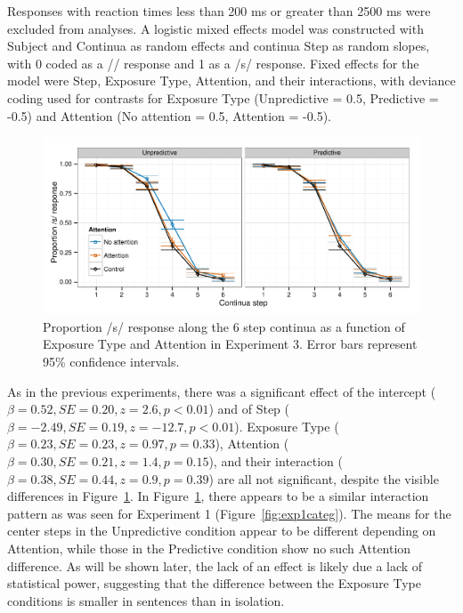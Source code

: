 Responses with reaction times less than 200 ms or greater than 2500 ms were excluded from analyses. 
A logistic mixed effects model was constructed with Subject and Continua as random effects and continua Step as random slopes, with 0 coded as a /\textesh/ response and 1 as a /s/ response.  Fixed effects for the model were Step, Exposure Type, Attention, and their interactions, with deviance coding used for contrasts for Exposure Type (Unpredictive = 0.5, Predictive = -0.5) and Attention (No attention = 0.5, Attention = -0.5).


\begin{figure}[!ht]
\caption{Proportion /s/ response along the 6 step continua as a function of Exposure Type and Attention in Experiment 3.  Error bars represent 95\% confidence intervals.}
\label{fig:exp3categ}
\begin{center}
\includegraphics[width=\textwidth]{graphs/exp3_categresults}
\end{center}
\end{figure}

As in the previous experiments, there was a significant effect of the intercept ($\beta = 0.52, SE = 0.20, z = 2.6, p < 0.01$) and of Step ($\beta = -2.49, SE = 0.19, z = -12.7, p < 0.01$).
Exposure Type ($\beta = 0.23, SE = 0.23, z = 0.97, p = 0.33$), Attention ($\beta = 0.30, SE = 0.21, z = 1.4, p = 0.15$), and their interaction ($\beta = 0.38, SE = 0.44, z = 0.9, p = 0.39$) are all not significant, despite the visible differences in Figure~\ref{fig:exp3categ}.
In Figure~\ref{fig:exp3categ}, there appears to be a similar interaction pattern as was seen for Experiment 1 (Figure~\ref{fig:exp1categ}).
The means for the center steps in the Unpredictive condition appear to be different depending on Attention, while those in the Predictive condition show no such Attention difference.
As will be shown later, the lack of an effect is likely due a lack of statistical power, suggesting that the difference between the Exposure Type conditions is smaller in sentences than in isolation.

